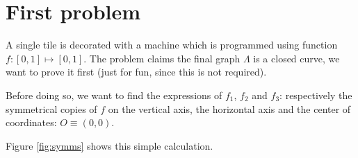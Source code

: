 \section{First problem}
\label{sec:p1}

A single tile is decorated with a machine which is programmed using function 
$f:[0,1] \mapsto [0,1]$. The problem \cite{exam1} claims the final graph $\Lambda$ is
a closed curve, we want to prove it first (just for fun, since this is not required).

Before doing so, we want to find the expressions of $f_1$, $f_2$ and $f_3$: respectively
the symmetrical copies of $f$ on the vertical axis, the horizontal axis and the center 
of coordinates: $O \equiv (0,0)$.
%

%
Figure \ref{fig:symms} shows this simple calculation.

